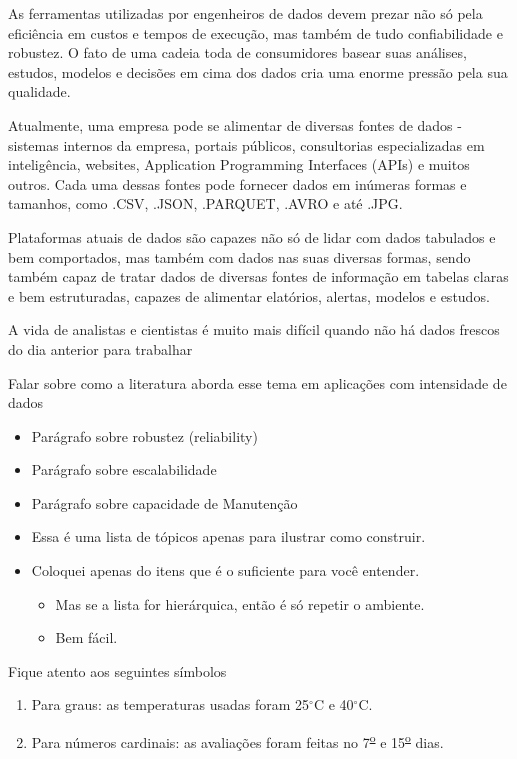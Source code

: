 \documentclass[9pt, a4paper, twocolumn]{article}
\begin{document}
As ferramentas utilizadas por engenheiros de dados devem prezar não só pela eficiência
em custos e tempos de execução, mas também de tudo confiabilidade e robustez.
O fato de uma cadeia toda de consumidores basear suas análises, estudos, modelos
e decisões em cima dos dados cria uma enorme pressão pela sua qualidade.

Atualmente, uma empresa pode se alimentar de diversas fontes de dados -
sistemas internos da empresa, portais públicos, consultorias especializadas
em inteligência, websites, Application Programming Interfaces (APIs) e muitos outros.
Cada uma dessas fontes pode fornecer dados em inúmeras formas e tamanhos, como .CSV, .JSON,
.PARQUET, .AVRO e até .JPG.

Plataformas atuais de dados são capazes não só de lidar com dados tabulados e bem
comportados, mas também com dados nas suas diversas formas, sendo também capaz de
tratar dados de diversas fontes de informação em tabelas claras e bem estruturadas,
capazes de alimentar elatórios, alertas, modelos e estudos. 


A vida de analistas e cientistas é muito mais difícil quando não há dados frescos
do dia anterior para trabalhar

Falar sobre como a literatura aborda esse tema em aplicações com intensidade de dados 
\begin{itemize}
\item Parágrafo sobre robustez (reliability)
\item Parágrafo sobre escalabilidade 
\item Parágrafo sobre capacidade de Manutenção
\end{itemize}

\lipsum[3-5]


\begin{itemize}
\item Essa é uma lista de tópicos apenas para ilustrar como construir.
\item Coloquei apenas do itens que é o suficiente para você entender.
  \begin{itemize}
  \item Mas se a lista for hierárquica, então é só repetir o ambiente.
  \item Bem fácil.
  \end{itemize}
\end{itemize}

Fique atento aos seguintes símbolos

\begin{enumerate}
\item Para graus: as temperaturas usadas foram 25$^{\circ}$C e 40$^{\circ}$C.
\item Para números cardinais: as avaliações foram feitas no
  7\textsuperscript{\underline{o}} e 15\textsuperscript{\underline{o}}
  dias.
\end{enumerate}
\end{document}
